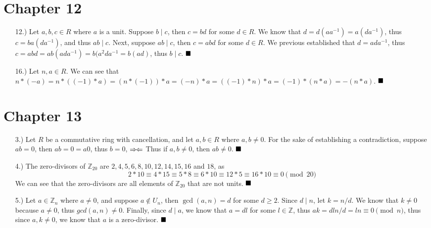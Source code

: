 \documentclass[11pt]{article}
\newcommand{\contradiction}{
    \ensuremath{{\Rightarrow\mspace{-2mu}\Leftarrow}}
}
\newcommand{\done}{
    \ensuremath{\strut\hfill\blacksquare}
}
\newcommand{\Z}{\mathbb{Z}}
\begin{document}
\pagestyle{fancy}
\fancyhead{}

\normalsize

\section*{Chapter 12}
\begin{itemize}
    \item [12.)] Let $a,b,c\in R$ where $a$ is a unit. Suppose $b\mid c$, then $c=bd$ for some $d\in R$. We know that $d=d(aa^{-1})=a(da^{-1})$, thus $c=ba(da^{-1})$, and thus $ab\mid c$. Next, suppose $ab\mid c$, then $c=abd$ for some $d\in R$. We previous established that $d=ada^{-1}$, thus $c=abd=ab(ada^{-1})=b(a^2da^{-1}=b(ad)$, thus $b\mid c$. \done

\item [16.)] Let $n,a\in R$. We can see that $n*(-a)=n*((-1)*a)=(n*(-1))*a=(-n)*a=((-1)*n)*a=(-1)*(n*a)=-(n*a)$. \done
\end{itemize}

\section*{Chapter 13}
\begin{itemize}
    \item [3.)] Let $R$ be a commutative ring with cancellation, and let $a,b\in R$ where $a,b\ne0$. For the sake of establishing a contradiction, suppose $ab=0$, then $ab=0=a0$, thus $b=0$,\contradiction Thus if $a,b\ne0$, then $ab\ne0$. \done

    \item [4.)] The zero-divisors of $\Z_{20}$ are $2,4,5,6,8,10,12,14,15,16$ and $18$, as 
    \[2*10\equiv4*15\equiv5*8\equiv6*10\equiv12*5\equiv16*10\equiv0\pmod{20}\]
    We can see that the zero-divisors are all elements of $\Z_{20}$ that are not units. \done

    \item [5.)] Let $a\in\Z_n$ where $a\ne0$, and suppose $a\notin U_n$, then $\gcd(a,n)=d$ for some $d\geq2$. Since $d\mid n$, let $k=n/d$. We know that $k\ne0$ because $a\ne0$, thus $gcd(a,n)\ne0$. Finally, since $d\mid a$, we know that $a=dl$ for some $l\in\Z$, thus $ak=dln/d=ln\equiv0\pmod{n}$, thus since $a,k\ne0$, we know that $a$ is a zero-divisor. \done
\end{itemize}
\end{document}
